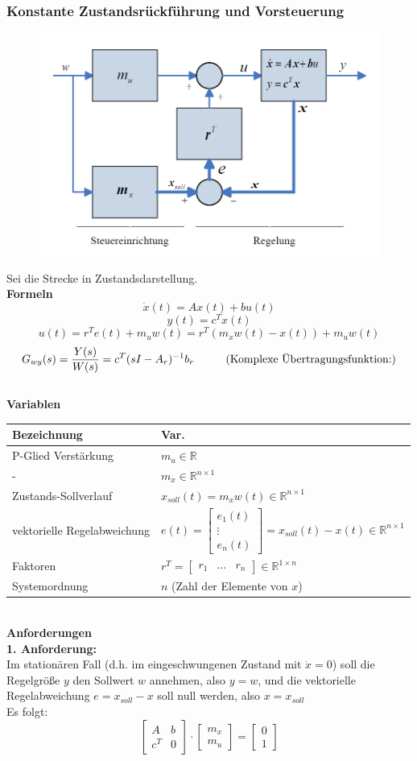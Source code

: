 \documentclass[10pt,a4paper]{article}
\newcommand{\tab}[1][1]{\hspace*{#1cm}}
\newcommand{\vect}[1]{\ensuremath{\begin{bmatrix}#1\end{bmatrix}}}
\begin{document}
\subsubsection{Konstante Zustandsrückführung und Vorsteuerung}
\label{zustandsrueckfuehrung}
\begin{figure}[H]
	\includegraphics[width=0.7\columnwidth]{imgs/abb7_10.png}
\end{figure}

Sei die Strecke in Zustandsdarstellung. \\

\textbf{Formeln}
$$
	\dot x(t) = Ax(t) + bu(t)
$$
$$
	y(t) = c^Tx(t)
$$
$$
	u(t) = r^Te(t) + m_uw(t) = r^T(m_xw(t)-x(t)) + m_u w(t)
$$
$$
	G_{wy}(s) = \frac{Y(s)}{W(s)} = c^T(sI-A_r)^{-1}b_r \tab (\text{Komplexe Übertragungsfunktion:})
$$ ~\\

\textbf{Variablen} ~\\
\begin{tabularx}{\columnwidth}{ll}
	Bezeichnung & Var. \\
	\hline
	P-Glied Verstärkung & $m_u \in \mathbb{R}$ \\
	\tab - & $m_x \in \mathbb{R}^{n \times 1}$  \\
	Zustands-Sollverlauf & $x_{soll}(t) = m_xw(t) \in \mathbb{R}^{n \times 1}$  \\
	vektorielle Regelabweichung & $e(t) = \vect{e_1(t) \\ \vdots \\ e_n(t)} = x_{soll}(t) - x(t) \in \mathbb{R}^{n \times 1}$  \\
	Faktoren & $r^T = \vect{r_1 & \dots & r_n} \in \mathbb{R}^{1 \times n}$ \\
	Systemordnung & $n$ (Zahl der Elemente von $x$)
\end{tabularx} ~\\

\textbf{Anforderungen} ~\\
\textbf{1. Anforderung:} ~\\
Im stationären Fall (d.h. im eingeschwungenen Zustand mit $\dot x = 0$) soll die Regelgröße $y$ den Sollwert $w$ annehmen, also $y = w$, und die vektorielle Regelabweichung $e = x_{soll} − x$ soll null werden, also $x = x_{soll}$ \\
Es folgt:
$$
	\vect{A & b \\ c^T & 0} ⋅ \vect{m_x \\ m_u} = \vect{0 \\ 1}
$$
\end{document}
